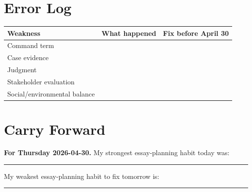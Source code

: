 \documentclass[11pt,a4paper]{article}
\begin{document}
\section{Error Log}

\begin{tabularx}{\textwidth}{L{0.23\textwidth}Y Y}
\toprule
\textbf{Weakness} & \textbf{What happened} & \textbf{Fix before April 30} \\
\midrule
Command term & & \\
Case evidence & & \\
Judgment & & \\
Stakeholder evaluation & & \\
Social/environmental balance & & \\
\bottomrule
\end{tabularx}

\section{Carry Forward}

\noindent\colorbox{SoftGreen}{%
\begin{minipage}{0.965\textwidth}
\sffamily\raggedright
\textbf{\textcolor{HeadingBlue}{For Thursday 2026-04-30.}}
My strongest essay-planning habit today was:
\rule{0.42\textwidth}{0.4pt}

My weakest essay-planning habit to fix tomorrow is:
\rule{0.38\textwidth}{0.4pt}
\end{minipage}
}
\end{document}
